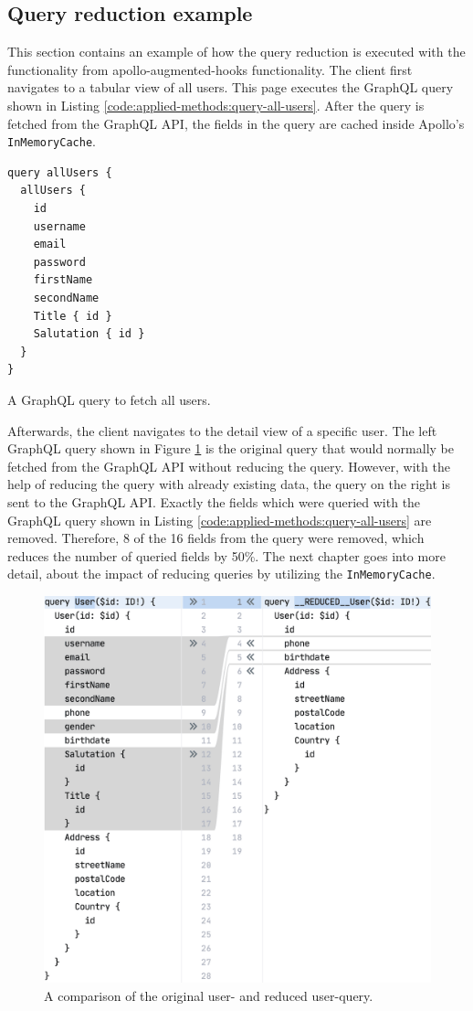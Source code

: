 \subsection{Query reduction example}\label{subsection:background:graphql:example-reduction}

This section contains an example of how the query reduction is executed with the functionality from apollo-augmented-hooks functionality. The client first navigates to a tabular view of all users. This page executes the GraphQL query shown in Listing \ref{code:applied-methods:query-all-users}. After the query is fetched from the GraphQL \ac{API}, the fields in the query are cached inside Apollo's \texttt{InMemoryCache}.

\ifshowListings
\begin{listing}[H]
\begin{verbatim}
query allUsers {
  allUsers {
    id
    username
    email
    password
    firstName
    secondName
    Title { id }
    Salutation { id }
  }
}
\end{verbatim}
\caption{A GraphQL query to fetch all users.}\label{code:applied-methods:query-all-users}
\end{listing}
\fi

\noindent Afterwards, the client navigates to the detail view of a specific user. The left GraphQL query shown in Figure \ref{fig:applied-methods:comparison-user-reduced-user} is the original query that would normally be fetched from the GraphQL \ac{API} without reducing the query. However, with the help of reducing the query with already existing data, the query on the right is sent to the GraphQL \ac{API}. Exactly the fields which were queried with the GraphQL query shown in Listing \ref{code:applied-methods:query-all-users} are removed. Therefore, 8 of the 16 fields from the query were removed, which reduces the number of queried fields by 50\%. The next chapter goes into more detail, about the impact of reducing queries by utilizing the \texttt{InMemoryCache}.

\ifshowImages
  \begin{figure}[H]
  \centering
  \includegraphics[width=0.65\linewidth]{images/reduction-graphql-examples/compare-user-reduced-user.png}
  \caption{A comparison of the original user- and reduced user-query.}\label{fig:applied-methods:comparison-user-reduced-user}
  \end{figure}
\fi
